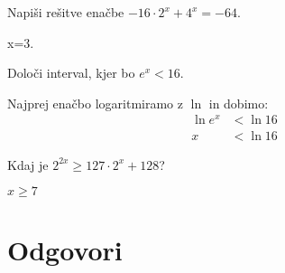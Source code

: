 \begin{vaja}
	Napiši rešitve enačbe $-16 \cdot 2^x+4^x=-64$.
  \begin{odgovor}
   	x=3.
  \end{odgovor}
\end{vaja}

\begin{vaja}
Določi interval, kjer bo $e^x < 16$.
  \begin{odgovor}
   Najprej enačbo logaritmiramo z $\ln$ in dobimo:
\begin{align*}
\ln{e^x}&< \ln 16 \\
x &< \ln 16
\end{align*}
  \end{odgovor}
\end{vaja}

\begin{vaja}
Kdaj je $2^{2x} \geq 127 \cdot 2^x + 128$?
  \begin{odgovor}
   $x \geq 7$
  \end{odgovor}
\end{vaja}

\begin{vaja}
  \begin{odgovor}
   
  \end{odgovor}
\end{vaja}



\section{Odgovori}
\label{sec:explog-odgovori}




